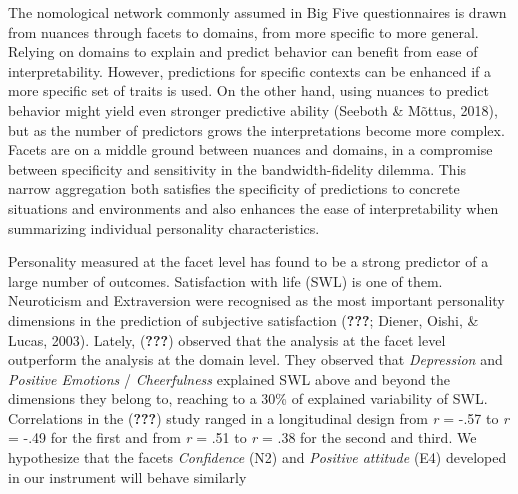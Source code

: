 \documentclass[,man,floatsintext]{apa6}
\begin{document}
The nomological network commonly assumed in Big Five questionnaires is
drawn from nuances through facets to domains, from more specific to more
general. Relying on domains to explain and predict behavior can benefit
from ease of interpretability. However, predictions for specific
contexts can be enhanced if a more specific set of traits is used. On
the other hand, using nuances to predict behavior might yield even
stronger predictive ability (Seeboth \& Mõttus, 2018), but as the number
of predictors grows the interpretations become more complex. Facets are
on a middle ground between nuances and domains, in a compromise between
specificity and sensitivity in the bandwidth-fidelity dilemma. This
narrow aggregation both satisfies the specificity of predictions to
concrete situations and environments and also enhances the ease of
interpretability when summarizing individual personality
characteristics.

Personality measured at the facet level has found to be a strong
predictor of a large number of outcomes. Satisfaction with life (SWL) is
one of them. Neuroticism and Extraversion were recognised as the most
important personality dimensions in the prediction of subjective
satisfaction ({\textbf{???}}; Diener, Oishi, \& Lucas, 2003). Lately,
({\textbf{???}}) observed that the analysis at the facet level
outperform the analysis at the domain level. They observed that
\emph{Depression} and \emph{Positive Emotions} / \emph{Cheerfulness}
explained SWL above and beyond the dimensions they belong to, reaching
to a 30\% of explained variability of SWL. Correlations in the
({\textbf{???}}) study ranged in a longitudinal design from \emph{r} =
-.57 to \emph{r} = -.49 for the first and from \emph{r} = .51 to
\emph{r} = .38 for the second and third. We hypothesize that the facets
\emph{Confidence} (N2) and \emph{Positive attitude} (E4) developed in
our instrument will behave similarly
\end{document}
